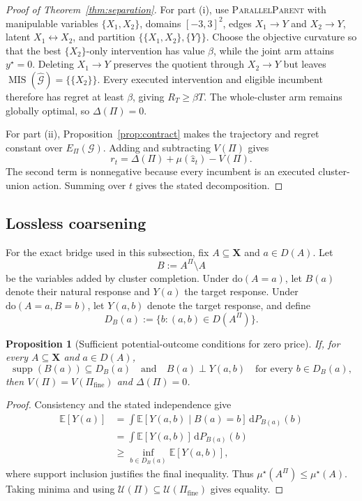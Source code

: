 \documentclass[twoside]{article}
\newtheorem{proposition}{Proposition}
\newcommand{\E}{\mathbb{E}}
\newcommand{\doo}{\mathrm{do}}
\newcommand{\Gg}{\mathcal{G}}
\begin{document}
\begin{proof}[Proof of Theorem~\ref{thm:separation}]
For part (i), use \textsc{ParallelParent} with manipulable variables \(\{X_1,X_2\}\), domains \([-3,3]^2\), edges \(X_1\to Y\) and \(X_2\to Y\), latent \(X_1\leftrightarrow X_2\), and partition \(\{\{X_1,X_2\},\{Y\}\}\). Choose the objective curvature so that the best \(\{X_2\}\)-only intervention has value \(\beta\), while the joint arm attains \(y^\star=0\). Deleting \(X_1\to Y\) preserves the quotient through \(X_2\to Y\) but leaves \(\operatorname{MIS}(\widehat{\Gg})=\{\{X_2\}\}\). Every executed intervention and eligible incumbent therefore has regret at least \(\beta\), giving \(R_T\ge\beta T\). The whole-cluster arm remains globally optimal, so \(\Delta(\Pi)=0\).

For part (ii), Proposition~\ref{prop:contract} makes the trajectory and regret constant over \(E_\Pi(\Gg)\). Adding and subtracting \(V(\Pi)\) gives
\[
 r_t=\Delta(\Pi)+\mu(\hat z_t)-V(\Pi).
\]
The second term is nonnegative because every incumbent is an executed cluster-union action. Summing over \(t\) gives the stated decomposition.
\end{proof}

\subsection{Lossless coarsening}

For the exact bridge used in this subsection, fix \(A\subseteq\mathbf X\) and \(a\in D(A)\). Let
\[
 B:=A^\Pi\setminus A
\]
be the variables added by cluster completion. Under \(\doo(A=a)\), let \(B(a)\) denote their natural response and \(Y(a)\) the target response. Under \(\doo(A=a,B=b)\), let \(Y(a,b)\) denote the target response, and define
\[
 D_B(a):=\{b:(a,b)\in D(A^\Pi)\}.
\]

\begin{proposition}[Sufficient potential-outcome conditions for zero price]
\label{prop:free}
If, for every \(A\subseteq\mathbf X\) and \(a\in D(A)\),
\[
 \operatorname{supp}(B(a))\subseteq D_B(a)
 \quad\text{and}\quad
 B(a)\perp Y(a,b)\quad\text{for every }b\in D_B(a),
\]
then \(V(\Pi)=V(\Pi_{\mathrm{fine}})\) and \(\Delta(\Pi)=0\).
\end{proposition}

\begin{proof}
Consistency and the stated independence give
\[
\begin{aligned}
 \E[Y(a)]
 &=\int \E[Y(a,b)\mid B(a)=b]\,\mathrm dP_{B(a)}(b)\\
 &=\int \E[Y(a,b)]\,\mathrm dP_{B(a)}(b)\\
 &\ge \inf_{b\in D_B(a)}\E[Y(a,b)],
\end{aligned}
\]
where support inclusion justifies the final inequality. Thus \(\mu^\star(A^\Pi)\le\mu^\star(A)\). Taking minima and using \(\mathcal U(\Pi)\subseteq\mathcal U(\Pi_{\mathrm{fine}})\) gives equality.
\end{proof}
\end{document}
